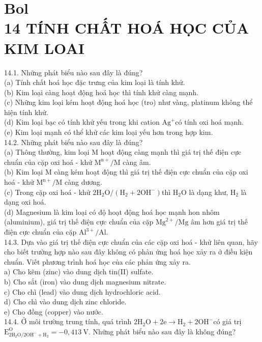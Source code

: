 \documentclass[10pt]{article}
\begin{document}
\section*{Bol \\
 14 TÍNH CHẤT HOÁ HỌC CỦA KIM LOAI}
14.1. Những phát biểu nào sau đây là đúng?\\
(a) Tính chất hoá học đặc trưng của kim loại là tính khử.\\
(b) Kim loại càng hoạt động hoá học thì tính khử càng mạnh.\\
(c) Những kim loại kém hoạt động hoá học (tro) như vàng, platinum không thể hiện tính khử.\\
(d) Kim loại bạc có tính khử yếu trong khi cation $\mathrm{Ag}^{+}$có tính oxi hoá mạnh.\\
(e) Kim loại mạnh có thể khử các kim loại yếu hơn trong hợp kim.\\
14.2. Những phát biểu nào sau đây là đúng?\\
(a) Thông thường, kim loại M hoạt động càng mạnh thì giá trị thế điện cực chuẩn của cặp oxi hoá - khử $\mathrm{M}^{\mathrm{n}+} / \mathrm{M}$ càng âm.\\
(b) Kim loại M càng kém hoạt động thì giá trị thế điện cực chuẩn của cặp oxi hoá - khử $\mathrm{M}^{\mathrm{n}+} / \mathrm{M}$ càng dương.\\
(c) Trong cặp oxi hoá - khử $2 \mathrm{H}_{2} \mathrm{O} /\left(\mathrm{H}_{2}+2 \mathrm{OH}^{-}\right)$thì $\mathrm{H}_{2} \mathrm{O}$ là dạng khư, $\mathrm{H}_{2}$ là dạng oxi hoá.\\
(d) Magnesium là kim loại có độ hoạt động hoá học mạnh hon nhôm (aluminium), giá trị thế điện cực chuẩn của cặp $\mathrm{Mg}^{2+} / \mathrm{Mg}$ âm hơn giá trị thế điện cực chuẩn của cặp $\mathrm{Al}^{3+} / \mathrm{Al}$.\\
14.3. Dựa vào giá trị thế điện cực chuẩn của các cặp oxi hoá - khử liên quan, hãy cho biết trường hợp nào sau đây không có phản ứng hoá học xảy ra ở điều kiện chuẩn. Viết phương trình hoá học của các phản ứng xảy ra.\\
a) Cho kẽm (zinc) vào dung dịch tin(II) sulfate.\\
b) Cho sắt (iron) vào dung dịch magnesium nitrate.\\
c) Cho chì (lead) vào dung dịch hydrochloric acid.\\
d) Cho chì vào dung dịch zinc chloride.\\
e) Cho đồng (copper) vào nước.\\
14.4. Ở môi trường trung tính, quá trình $2 \mathrm{H}_{2} \mathrm{O}+2 \mathrm{e} \rightarrow \mathrm{H}_{2}+2 \mathrm{OH}^{-}$có giá trị $\mathrm{E}_{2 \mathrm{H}_{2} \mathrm{O} / 2 \mathrm{OH}^{-}+\mathrm{H}_{2}}^{\mathrm{O}}=-0,413 \mathrm{~V}$. Những phát biểu nào sau đây là không đúng?\\
\end{document}
